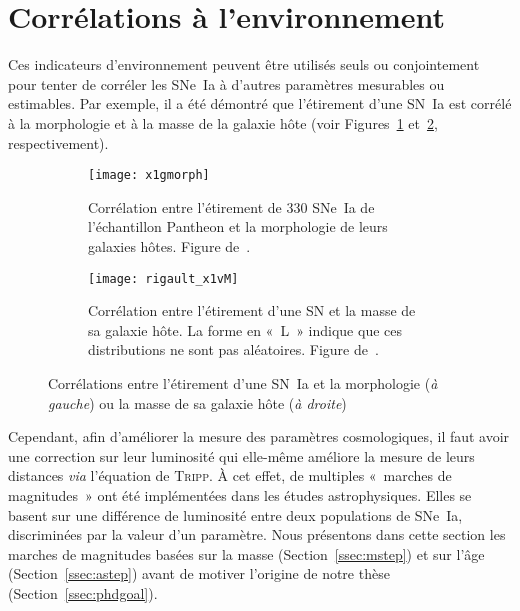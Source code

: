 \documentclass[../main/main.tex]{subfiles}
\begin{document}
\section{Corrélations à l'environnement}\label{sec:envcorr}

Ces indicateurs d'environnement peuvent être utilisés seuls ou conjointement
pour tenter de corréler les SNe~Ia à d'autres paramètres mesurables ou
estimables. Par exemple, il a été démontré que l'étirement d'une SN~Ia est
corrélé à la morphologie et à la masse de la galaxie hôte (voir
Figures~\ref{fig:x1gmorph} et~\ref{fig:mcorrx1}, respectivement).

\begin{figure}[ht]
    \centering
    \begin{subfigure}[c]{.48\linewidth}
        \centering
        \texttt{[image: x1gmorph]}
        \caption[Corrélation entre l'étirement des SNe~Ia et la morphologie de
        leurs galaxies hôtes]{Corrélation entre l'étirement de 330 SNe~Ia de
            l'échantillon Pantheon \citep{scolnic2018} et la morphologie de
        leurs galaxies hôtes. Figure de~\cite{pruzhinskaya2020}.}
        \label{fig:x1gmorph}
    \end{subfigure}
    \hfill
    \begin{subfigure}[c]{.48\linewidth}
        \centering
        \texttt{[image: rigault\_x1vM]}
        \caption[Corrélation entre l'étirement d'une SN et la masse de sa
        galaxie hôte]{Corrélation entre l'étirement d'une SN et la masse de sa
            galaxie hôte. La forme en «~L~» indique que ces distributions ne
        sont pas aléatoires. Figure de~\cite{rigault2013}.}
        \label{fig:mcorrx1}
    \end{subfigure}
    \caption[Corrélations entre l'étirement d'une SN~Ia et la morphologie ou la
    masse de sa galaxie hôte]{Corrélations entre l'étirement d'une SN~Ia et la
        morphologie (\textit{à gauche}) ou la masse de sa galaxie hôte
    (\textit{à droite})}
    \label{fig:x1corrs}
\end{figure}

Cependant, afin d'améliorer la mesure des paramètres cosmologiques, il faut
avoir une correction sur leur luminosité qui elle-même améliore la mesure de
leurs distances \textit{via} l'équation de \textsc{Tripp}. À cet effet, de
multiples «~marches de magnitudes~» ont été implémentées dans les études
astrophysiques. Elles se basent sur une différence de luminosité entre deux
populations de SNe~Ia, discriminées par la valeur d'un paramètre. Nous
présentons dans cette section les marches de magnitudes basées sur la masse
(Section~\ref{ssec:mstep}) et sur l'âge (Section~\ref{ssec:astep}) avant de
motiver l'origine de notre thèse (Section~\ref{ssec:phdgoal}).
\end{document}
